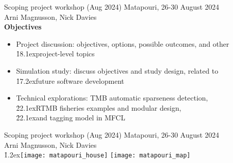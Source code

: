 \documentclass[aspectratio=169,fleqn]{beamer}
\begin{document}

\begin{frame}{Scoping project workshop (Aug 2024)}
  Matapouri, 26-30 August 2024\\[1ex]
  Arni Magnusson, Nick Davies\\[3ex]
  \textbf{Objectives}\\[1.5ex]
  \begin{itemize}
    \item[] {\green Project discussion}: objectives, options, possible outcomes,
    and other\\
    \h{18.1ex}project-level topics\\[2ex]
    \item[] {\green Simulation study}: discuss objectives and study design,
    related to\\
    \h{17.2ex}future software development\\[2ex]
    \item[] {\green Technical explorations}: TMB automatic sparseness
    detection,\\
    \h{22.1ex}RTMB fisheries examples and modular design,\\
    \h{22.1ex}and tagging model in MFCL\\[2.5ex]
  \end{itemize}
\end{frame}


\begin{frame}{Scoping project workshop (Aug 2024)}
  Matapouri, 26-30 August 2024\\[1ex]
  Arni Magnusson, Nick Davies\\[3ex]
  \h{1.2ex}\texttt{[image: matapouri\_house]}\qquad
  \texttt{[image: matapouri\_map]}
  \vspace{2.6ex}
\end{frame}

\end{document}
